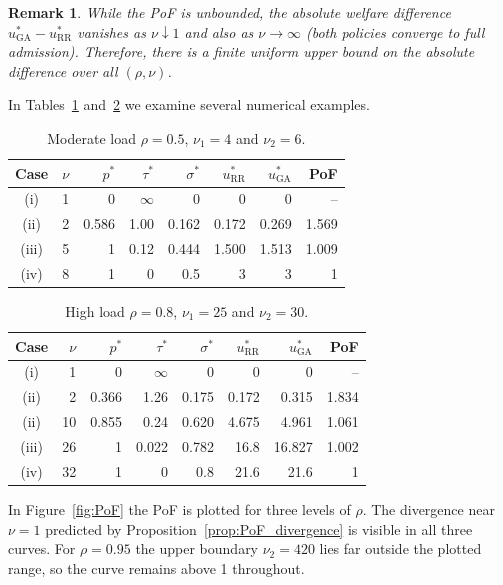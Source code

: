 \documentclass[11pt]{article}
\newtheorem{remark}[theorem]{Remark}
\begin{document}
\begin{remark}\label{rem:bound_diff}
While the PoF is unbounded, the absolute welfare difference $u^*_{\mathrm{GA}}-u^*_{\mathrm{RR}}$ vanishes as $\nu\downarrow 1$ and also as $\nu\to\infty$ (both policies converge to full admission).  Therefore, there is a finite uniform upper bound on the absolute difference over all $(\rho,\nu)$.
\end{remark}

In Tables~\ref{tbl:1} and~\ref{tbl:2} we examine several numerical examples.
\begin{table}[h]
\centering
\begin{tabular}{crrrrrrr}
\hline
Case & $\nu$ & $p^*$ & $\tau^*$ & $\sigma^*$ & $u^*_{\mathrm{RR}}$ & $u^*_{\mathrm{GA}}$ & PoF \\
\hline
(i) &  1 & 0 & $\infty$ & 0 &  0 &  0 & -- \\
(ii) & 2 & 0.586 & 1.00 & 0.162 &  0.172 &  0.269 & 1.569 \\
(iii) & 5 & 1 & 0.12 & 0.444 &  1.500 &  1.513 & 1.009 \\
(iv) & 8 & 1  & 0 & 0.5 & 3 & 3 & 1 \\
\hline
\end{tabular}
\caption{Moderate load $\rho=0.5$, $\nu_1=4$ and $\nu_2=6$.}\label{tbl:1}
\end{table}

\begin{table}[h]
\centering
\begin{tabular}{crrrrrrr}
\hline
Case & $\nu$ & $p^*$ & $\tau^*$ & $\sigma^*$ & $u^*_{\mathrm{RR}}$ & $u^*_{\mathrm{GA}}$ & PoF \\
\hline
(i) &  1 & 0 & $\infty$ & 0 &  0 &  0 & -- \\
(ii) & 2 & 0.366 & 1.26 & 0.175 &  0.172 &  0.315 & 1.834 \\
(ii) & 10 & 0.855 & 0.24 & 0.620 &  4.675 &  4.961 & 1.061 \\
(iii) & 26 & 1 & 0.022 & 0.782 &  16.8 &  16.827 & 1.002 \\
(iv) & 32 & 1  & 0 & 0.8 & 21.6 & 21.6 & 1 \\
\hline
\end{tabular}
\caption{High load $\rho=0.8$, $\nu_1=25$ and $\nu_2=30$.}\label{tbl:2}
\end{table}

In Figure~\ref{fig:PoF} the PoF is plotted for three levels of $\rho$.  The divergence near $\nu=1$ predicted by Proposition~\ref{prop:PoF_divergence} is visible in all three curves.  For $\rho=0.95$ the upper boundary $\nu_2=420$ lies far outside the plotted range, so the curve remains above 1 throughout.
\end{document}
